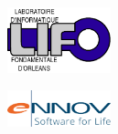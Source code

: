 {\begin{sffamily}
\vspace{0.8cm}

\begin{minipage}{3cm}
\includegraphics[width=3cm]{logos/logoLIFO.png} 
\end{minipage}
\hfill
\begin{minipage}{3cm}
\includegraphics[width=3cm]{logos/logoEnnov.png} 
\end{minipage}
\hfill

\end{sffamily}
}
\setlength{\voffset}{0pt}